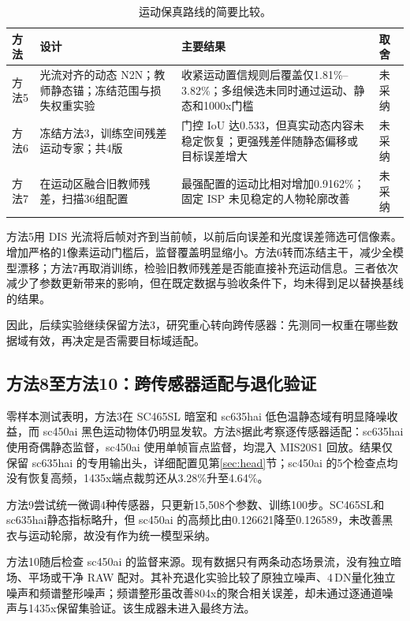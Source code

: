\documentclass[11pt,a4paper,UTF8,fontset=fandol]{ctexart}
\newcommand{\dn}{\ensuremath{\,\mathrm{DN}}}
\begin{document}
\begin{table}[!htbp]
\centering\small
\caption{运动保真路线的简要比较。}
\label{tab:motion_trials}
\begin{tabular}{P{0.10\textwidth}P{0.30\textwidth}P{0.38\textwidth}P{0.10\textwidth}}
\toprule
方法 & 设计 & 主要结果 & 取舍 \\
\midrule
方法5 & 光流对齐的动态 N2N；教师静态锚；冻结范围与损失权重实验 & 收紧运动置信规则后覆盖仅1.81\%--3.82\%；多组候选未同时通过运动、静态和1000x门槛 & 未采纳 \\
方法6 & 冻结方法3，训练空间残差运动专家；共4版 & 门控 IoU 达0.533，但真实动态内容未稳定恢复；更强残差伴随静态偏移或目标误差增大 & 未采纳 \\
方法7 & 在运动区融合旧教师残差，扫描36组配置 & 最强配置的运动比相对增加0.9162\%；固定 ISP 未见稳定的人物轮廓改善 & 未采纳 \\
\bottomrule
\end{tabular}
\end{table}

方法5用 DIS 光流将后帧对齐到当前帧，以前后向误差和光度误差筛选可信像素。增加严格的1像素运动门槛后，监督覆盖明显缩小。方法6转而冻结主干，减少全模型漂移；方法7再取消训练，检验旧教师残差是否能直接补充运动信息。三者依次减少了参数更新带来的影响，但在既定数据与验收条件下，均未得到足以替换基线的结果。

因此，后续实验继续保留方法3，研究重心转向跨传感器：先测同一权重在哪些数据域有效，再决定是否需要目标域适配。

\subsection{方法8至方法10：跨传感器适配与退化验证}

零样本测试表明，方法3在 SC465SL 暗室和 sc635hai 低色温静态域有明显降噪收益，而 sc450ai 黑色运动物体仍明显发软。方法8据此考察逐传感器适配：sc635hai 使用奇偶静态监督，sc450ai 使用单帧盲点监督，均混入 MIS20S1 回放。结果仅保留 sc635hai 的专用输出头，详细配置见第\ref{sec:head}节；sc450ai 的5个检查点均没有恢复高频，1435x端点裁剪还从3.28\%升至4.64\%。

方法9尝试统一微调4种传感器，只更新15,508个参数、训练100步。SC465SL和sc635hai静态指标略升，但 sc450ai 的高频比由0.126621降至0.126589，未改善黑衣与运动轮廓，故没有作为统一模型采纳。

方法10随后检查 sc450ai 的监督来源。现有数据只有两条动态场景流，没有独立暗场、平场或干净 RAW 配对。其补充退化实验比较了原独立噪声、4\dn{}量化独立噪声和频谱整形噪声；频谱整形虽改善804x的聚合相关误差，却未通过逐通道噪声与1435x保留集验证。该生成器未进入最终方法。
\end{document}
